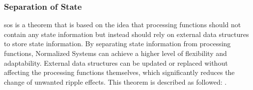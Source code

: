\subsubsection{Separation of State}

\gls{sos} is a theorem that is based on the idea that processing functions should not
contain any state information but instead should rely on external data structures to store
state information. By separating state information from processing functions, Normalized
Systems can achieve a higher level of flexibility and adaptability. External data
structures can be updated or replaced without affecting the processing functions
themselves, which significantly reduces the change of unwanted ripple effects. This theorem is
described as followed: \parencite[258]{mannaert_normalized_2016}.

